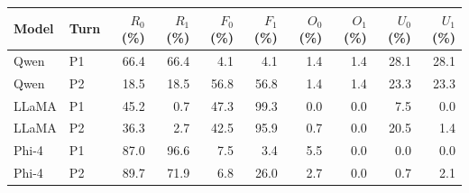 \begin{tabular}{@{}llrrrrrrrr@{}}
\toprule
Model & Turn & $R_0$ (\%) & $R_1$ (\%) & $F_0$ (\%) & $F_1$ (\%) & $O_0$ (\%) & $O_1$ (\%) & $U_0$ (\%) & $U_1$ (\%) \\
\midrule
Qwen & P1 & 66.4 & 66.4 & 4.1 & 4.1 & 1.4 & 1.4 & 28.1 & 28.1 \\
Qwen & P2 & 18.5 & 18.5 & 56.8 & 56.8 & 1.4 & 1.4 & 23.3 & 23.3 \\
LLaMA & P1 & 45.2 & 0.7 & 47.3 & 99.3 & 0.0 & 0.0 & 7.5 & 0.0 \\
LLaMA & P2 & 36.3 & 2.7 & 42.5 & 95.9 & 0.7 & 0.0 & 20.5 & 1.4 \\
Phi-4 & P1 & 87.0 & 96.6 & 7.5 & 3.4 & 5.5 & 0.0 & 0.0 & 0.0 \\
Phi-4 & P2 & 89.7 & 71.9 & 6.8 & 26.0 & 2.7 & 0.0 & 0.7 & 2.1 \\
\bottomrule
\end{tabular}
